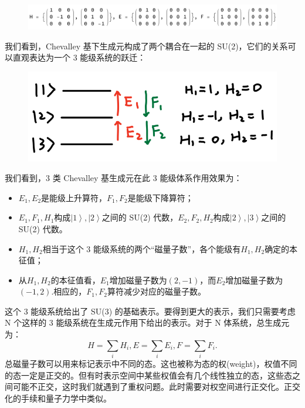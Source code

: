 \documentclass[UTF8]{ctexart}
\begin{document}
\begin{figure}[H]
\begin{centering}
\includegraphics[width=0.95\linewidth]{include/O3}
\par\end{centering}
\end{figure}

\noindent 我们看到，Chevalley 基下生成元构成了两个耦合在一起的 SU(2)，它们的关系可以直观表达为一个 3 能级系统的跃迁：

\begin{figure}[H]
\begin{centering}
\includegraphics[width=0.5\linewidth]{include/P1}
\par\end{centering}
\end{figure}

\noindent 我们看到，3 类 Chevalley 基生成元在此 3 能级体系作用效果为：
\begin{itemize}
	\item $E_1,E_2$是能级上升算符，$F_1,F_2$是能级下降算符；
	\item $E_1,F_1,H_1$构成$\left| 1 \right \rangle, \left| 2 \right \rangle$之间的 SU(2) 代数，$E_2,F_2,H_2$构成$\left| 2 \right \rangle, \left| 3 \right \rangle$之间的 SU(2) 代数。
	\item $H_1,H_2$相当于这个 3 能级系统的两个“磁量子数”，各个能级有$H_1, H_2$确定的本征值；
	\item 从$H_1,H_2$的本征值看，$E_1$增加磁量子数为$(2,-1)$，而$E_2$增加磁量子数为$(-1,2)$.相应的，$F_1,F_2$算符减少对应的磁量子数。
\end{itemize}
这个 3 能级系统给出了 SU(3) 的基础表示。要得到更大的表示，我们只需要考虑 N 个这样的 3 能级系统在生成元作用下给出的表示。对于 N 体系统，总生成元为：
\begin{equation}
	H = \sum_i H_i ,  E = \sum_i E_i ,  F = \sum_i F_i. 
\end{equation}
总磁量子数可以用来标记表示中不同的态。这也被称为态的权(weight)，权值不同的态一定是正交的。但有时表示空间中某些权值会有几个线性独立的态，这些态之间可能不正交，这时我们就遇到了重权问题。此时需要对权空间进行正交化。正交化的手续和量子力学中类似。
\end{document}
